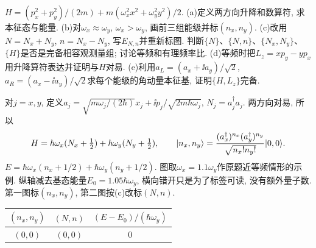 \begin{exercise}
$H=(p_x^2+p_y^2)/(2m)+m(\omega_x^2x^2+\omega_y^2y^2)/2$. (a)定义两方向升降和数算符, 求本征态与能量. (b)对$\omega_x\approx\omega_y$, $\omega_x>\omega_y$, 画前三组能级并标$(n_x,n_y)$. (c)改用$N=N_x+N_y$, $n=N_x-N_y$, 写$E_{N,n}$并重新标图. 判断$\{N\}$、$\{N,n\}$、$\{N_x,N_y\}$、$\{H\}$是否是完备相容观测量组; 讨论等频和有理频率比. (d)等频时把$L_z=xp_y-yp_x$用升降算符表达并证明与$H$对易. (e)利用$a_L=(a_x+\ii a_y)/\sqrt2$, $a_R=(a_x-\ii a_y)/\sqrt2$求每个能级的角动量本征基, 证明$\{H,L_z\}$完备.
\end{exercise}
\begin{solution}
对$j=x,y$, 定义$a_j=\sqrt{m\omega_j/(2\hbar)}x_j+\ii p_j/\sqrt{2m\hbar\omega_j}$, $N_j=a_j^\dagger a_j$. 两方向对易, 所以
\[
H=\hbar\omega_x(N_x+\tfrac12)+\hbar\omega_y(N_y+\tfrac12),\qquad
\lvert n_x,n_y\rangle=\frac{(a_x^\dagger)^{n_x}(a_y^\dagger)^{n_y}}{\sqrt{n_x!n_y!}}\lvert 0,0\rangle.
\]
$E=\hbar\omega_x(n_x+1/2)+\hbar\omega_y(n_y+1/2)$. 图取$\omega_x=1.1\omega_y$作原题近等频情形的示例. 纵轴减去基态能量$E_0=1.05\hbar\omega_y$, 横向错开只是为了标签可读, 没有额外量子数. 第一图标$(n_x,n_y)$, 第二图按(c)改标$(N,n)$.
\begin{center}
\end{center}
\begin{center}
\end{center}
\begin{center}\begin{tabular}{ccc}
\toprule $(n_x,n_y)$ & $(N,n)$ & $(E-E_0)/(\hbar\omega_y)$\\\midrule
$(0,0)$ & $(0,0)$ & $0$\\

\end{tabular}
\end{center}
\end{solution}
